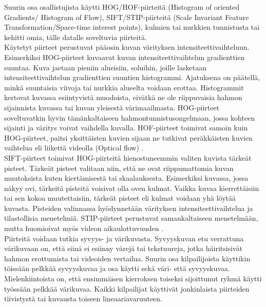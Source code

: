 Suurin osa osallistujista käytti HOG/HOF-piirteitä (Histogram of oriented Gradients/ Histogram of Flow), SIFT/STIP-piirteitä 
(Scale Invariant Feature Transformation/Space-time interest points), 
kulmien tai nurkkien tunnistusta tai kehitti omia, tälle datalle soveltuvia piirteitä. \citep {6239178}\\

Käytetyt piirteet perustuvat pääosin kuvan värityksen intensiteettivaihteluun.
Esimerkiksi HOG-piirteet kuvaavat kuvan intensiteettivaihtelun gradienttien suuntaa. Kuva jaetaan pieniin alueisiin, soluihin, 
joille lasketaan intensiteettivaihtelun gradienttien suuntien histogrammi. 
Ajatuksena on päätellä, minkä suuntaisia viivoja tai nurkkia alueelta voidaan erottaa. \citep {1467360} Histogrammit kertovat kuvassa esiintyvistä
muodoista, eivätkä ne ole riippuvaisia hahmon sijainnista kuvassa tai kuvan yleisestä värimaailmasta.
HOG-piirteet soveltuvatkin hyvin tämänkaltaiseen hahmontunnistusongelmaan, jossa kohteen sijainti ja väritys voivat vaihdella kuvalla.
HOF-piirteet toimivat samoin kuin HOG-piirteet, paitsi yksittäisten kuvien sijaan ne tutkivat peräkkäisten kuvien vaihtelua eli liikettä videolla (Optical flow) \citep{Pers20101369}.\\

SIFT-piirteet toimivat HOG-piirteitä hienostuneemmin valiten kuvista tärkeät pisteet. Tärkeät pisteet valitaan niin, että ne ovat riippumattomia
kuvan muutoksista kuten kiertämisestä tai skaalauksesta. Esimerkiksi kuvassa, jossa näkyy ovi, tärkeitä pisteitä voisivat olla oven kulmat.
Vaikka kuvaa kierrettäisiin tai sen kokoa muutettaisiin, tärkeät pisteet eli kulmat voidaan yhä löytää kuvasta.
Pisteiden valinnassa hyödynnetään värityksen intensiteettivaihtelua ja tilastollisia menetelmiä. \citep {790410}
STIP-piirteet perustuvat samankaltaiseen menetelmään, mutta huomioivat myös videon aikaulottuvuuden \citep{1238378}. \\

Piirteitä voidaan tutkia syvyys- ja värikuvasta. Syvyyskuvan etu verrattuna värikuvaan on, että siinä
ei esiinny värejä tai tekstuureja, jotka häiritsisivät hahmon erottumista tai videoiden vertailua.
Suurin osa kilpailijoista käyttikin töissään pelkkää syvyyskuvaa ja osa käytti sekä väri- että syvyyskuvaa. 
Mielenkiintoista on, että ensimmäisen kierroksen toiseksi sijoittunut ryhmä käytti työssään pelkkää värikuvaa. 
Kaikki kilpailijat käyttivät jonkinlaista piirteiden tiivistystä tai kuvausta toiseen lineaariavaruuteen. \citep {6239178}\\ 

